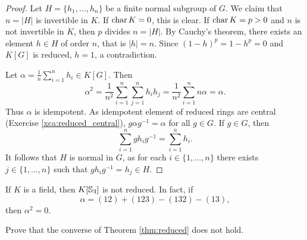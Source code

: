 \begin{proof}
    Let $H=\{h_1,\dots,h_n\}$ be a finite normal subgroup of $G$. 
    We claim that $n=|H|$ is invertible in $K$. If $\operatorname{char} K=0$, this 
    is clear. If $\operatorname{char} K=p>0$ and $n$ is not invertible in $K$, 
    then $p$ divides $n=|H|$. By Cauchy's theorem, 
    there exists an element $h\in H$ of order $n$, that is 
    $|h|=n$. Since $(1-h)^p=1-h^p=0$ and $K[G]$ is reduced,
    $h=1$, a contradiction. 
    
    Let $\alpha=\frac{1}{n}\sum_{i=1}^nh_i\in K[G]$. Then
    \[
    \alpha^2=\frac{1}{n^2}\sum_{i=1}^n\sum_{j=1}^nh_ih_j
    =\frac{1}{n^2}\sum_{i=1}^nn\alpha=\alpha.
    \]
    Thus $\alpha$ is idempotent. As idempotent 
    element of reduced rings are central (Exercise \ref{xca:reduced_central}), 
    $g\alpha g^{-1}=\alpha$ for all $g\in G$. If $g\in G$, 
    then 
    \[
    \sum_{i=1}^n gh_ig^{-1}=\sum_{i=1}^n h_i.
    \]
    It follows that $H$ is normal in $G$, 
    as for each $i\in\{1,\dots,n\}$ 
    there exists $j\in\{1,\dots,n\}$ such that 
    $gh_ig^{-1}=h_j\in H$. 
\end{proof}

\begin{example}
    If $K$ is a field, then $K[\mathbb{S}_3]$ is not reduced. 
    In fact, 
    if 
    \[
    \alpha=(12)+(123)-(132)-(13),
    \]
    then 
    $\alpha^2=0$. 
\end{example}

\begin{exercise}
    Prove that the converse of Theorem \ref{thm:reduced} 
    does not hold. 
\end{exercise}

